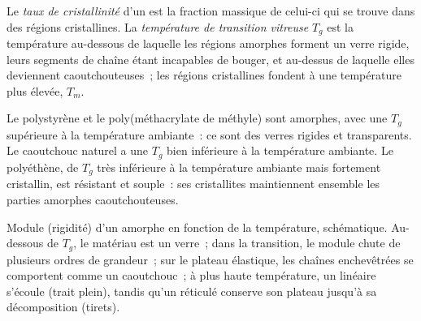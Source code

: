 \begin{definition}\label{def:b2:polymer-synthesis:transitions}
Le \emph{taux de cristallinité} d'un  est la
fraction massique de celui-ci qui se trouve dans des régions cristallines. La \emph{température de
transition vitreuse}
$T_g$ est la température au-dessous de laquelle les régions amorphes forment un verre rigide, leurs
segments de chaîne étant incapables de bouger, et au-dessus de laquelle elles deviennent caoutchouteuses~;
les régions cristallines fondent à une température plus élevée, $T_m$.
\end{definition}

Le polystyrène et le poly(méthacrylate de méthyle) sont amorphes, avec une $T_g$ supérieure à la
température ambiante~: ce sont des verres rigides et transparents. Le caoutchouc naturel a une $T_g$
bien inférieure à la température ambiante. Le polyéthène, de $T_g$ très inférieure à la température
ambiante mais fortement cristallin, est résistant et souple~: ses cristallites maintiennent ensemble les
parties amorphes caoutchouteuses.

\begin{omfigure}
\par\vspace{4pt}

{\small Module (rigidité) d'un  amorphe en fonction de la température, schématique. Au-dessous de
$T_g$, le matériau est un verre~; dans la transition, le module chute de plusieurs ordres de grandeur~;
sur le plateau élastique, les chaînes enchevêtrées se comportent comme un caoutchouc~; à plus haute
température, un  linéaire s'écoule (trait plein), tandis qu'un  réticulé conserve son
plateau jusqu'à sa décomposition (tirets).}
\end{omfigure}

